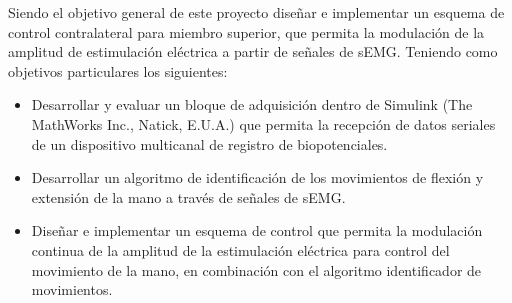 


Siendo el objetivo general de este proyecto diseñar e implementar un esquema de control contralateral para miembro superior, que permita la modulación de la amplitud de estimulación eléctrica a partir de señales de sEMG. Teniendo como objetivos particulares los siguientes:

\begin{itemize}
	\item Desarrollar y evaluar un bloque de adquisición dentro de Simulink\textregistered \;  (The MathWorks Inc., Natick, E.U.A.) que permita la recepción de datos seriales de un dispositivo multicanal de registro de biopotenciales.
	\item Desarrollar un algoritmo de identificación de los movimientos de flexión y extensión de la mano a través de señales de sEMG.
	\item Diseñar e implementar un esquema de control que permita la modulación continua de la amplitud de la estimulación eléctrica para control del movimiento de la mano, en combinación con el algoritmo identificador de movimientos.
\end{itemize}
